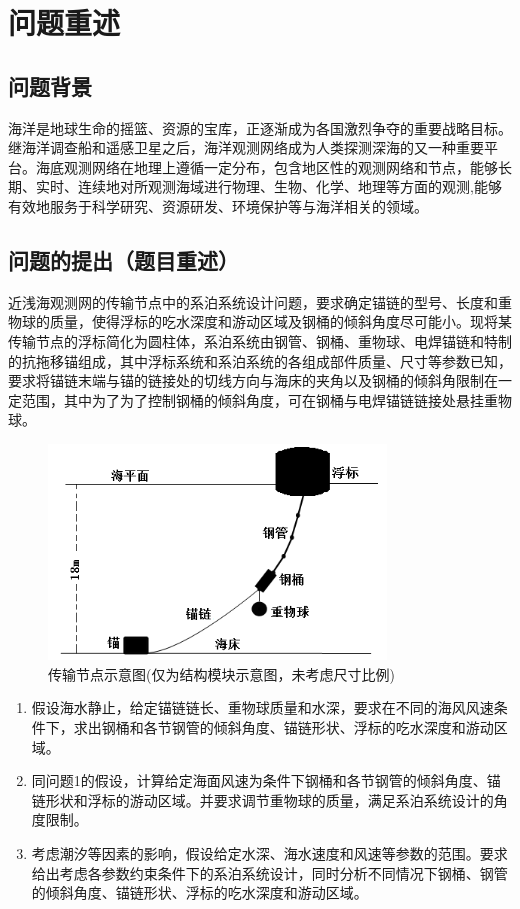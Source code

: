 \documentclass{cumcm}
\begin{document}
\newpage
\section{问题重述}
\subsection{问题背景}
海洋是地球生命的摇篮、资源的宝库，正逐渐成为各国激烈争夺的重要战略目标。继海洋调查船和遥感卫星之后，海洋观测网络成为人类探测深海的又一种重要平台。海底观测网络在地理上遵循一定分布，包含地区性的观测网络和节点，能够长期、实时、连续地对所观测海域进行物理、生物、化学、地理等方面的观测,能够有效地服务于科学研究、资源研发、环境保护等与海洋相关的领域。

\subsection{问题的提出（题目重述）}
近浅海观测网的传输节点中的系泊系统设计问题，要求确定锚链的型号、长度和重物球的质量，使得浮标的吃水深度和游动区域及钢桶的倾斜角度尽可能小。现将某传输节点的浮标简化为圆柱体，系泊系统由钢管、钢桶、重物球、电焊锚链和特制的抗拖移锚组成，其中浮标系统和系泊系统的各组成部件质量、尺寸等参数已知，要求将锚链末端与锚的链接处的切线方向与海床的夹角以及钢桶的倾斜角限制在一定范围，其中为了为了控制钢桶的倾斜角度，可在钢桶与电焊锚链链接处悬挂重物球。
\begin{figure}[H]
\centering
\includegraphics[width=0.8\textwidth]{img/title.jpg}
\caption{传输节点示意图(仅为结构模块示意图，未考虑尺寸比例)}\label{fig-buoy}
\end{figure}	

\begin{enumerate}[(1)]
	\item 假设海水静止，给定锚链链长、重物球质量和水深，要求在不同的海风风速条件下，求出钢桶和各节钢管的倾斜角度、锚链形状、浮标的吃水深度和游动区域。
	\item 同问题1的假设，计算给定海面风速为条件下钢桶和各节钢管的倾斜角度、锚链形状和浮标的游动区域。并要求调节重物球的质量，满足系泊系统设计的角度限制。
	\item 考虑潮汐等因素的影响，假设给定水深、海水速度和风速等参数的范围。要求给出考虑各参数约束条件下的系泊系统设计，同时分析不同情况下钢桶、钢管的倾斜角度、锚链形状、浮标的吃水深度和游动区域。
\end{enumerate}
\end{document}

